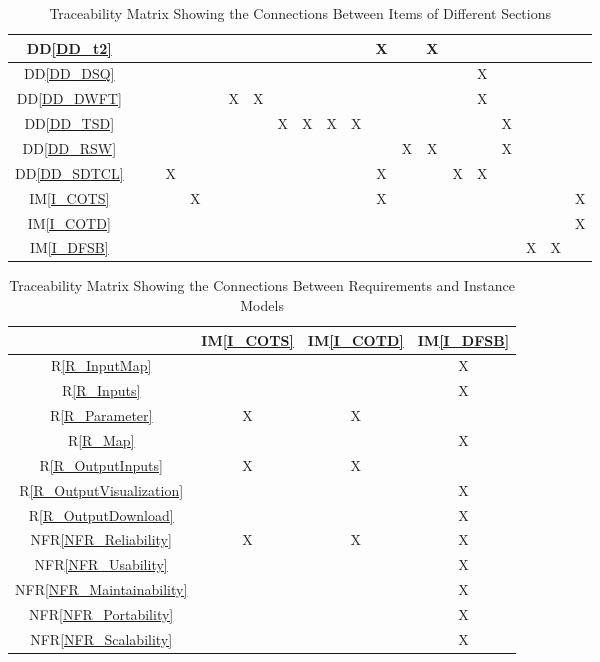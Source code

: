 \documentclass[12pt]{article}
\newcommand{\ddref}[1]{DD\ref{#1}}
\newcommand{\iref}[1]{IM\ref{#1}}
\newcommand{\rref}[1]{R\ref{#1}}
\newcommand{\nfrref}[1]{NFR\ref{#1}}
\begin{document}
\begin{landscape}
\begin{table}[h]
\begin{tabular}{|c|c|c|c|c|c|c|c|c|c|c|c|c|c|c|c|c|c|c|c|c|}
\ddref{DD_t2}        &  &  &  & & &  & &  &  &  &  & X & &  X &  & &&  & & \\ \hline
\ddref{DD_DSQ}     &  &  &  & & &  & &  &  &  &  & & &  &  & X &&  & &  \\ \hline
\ddref{DD_DWFT}     &  &  &  & & & X & X &  &  &  &  & & &  &  & X &&  & & \\ \hline
\ddref{DD_TSD}     &  &  &  & & &  & & X & X & X & X & & &  &  & &X&  & & \\ \hline
\ddref{DD_RSW}      &  &  &  & & &  & &  &  &  &  & & X & X &  & &X&  & & \\ \hline
\ddref{DD_SDTCL}    &  &  & X & & &  & &  &  &  &  & X & &  &  X&X &&  & & \\ \hline
\iref{I_COTS}        &  &  &  & X & &  & &  &  &  &  &  X & &  &  & &&  & & X \\ \hline
\iref{I_COTD}        &  &  &  & & &  & &  &  &  &  & & &  &  & &&  & & X \\ \hline
\iref{I_DFSB}       &  &  &  & & &  & &  &  &  &  & & &  &  & &&  X & X & \\ \hline
\hline
\end{tabular}
\caption{Traceability Matrix Showing the Connections Between Items of Different Sections}
\label{Table:A_trace}
\end{table}
 \end{landscape}

\newpage
\begin{table}[H]
\centering
\begin{tabular}{|c|c|c|c|}
\hline 
	& \iref{I_COTS} & \iref{I_COTD} & \iref{I_DFSB}  \\

\hline
\rref{R_InputMap} & & & X  \\ \hline
\rref{R_Inputs}     & & & X \\ \hline

\rref{R_Parameter} & X & X &  \\ \hline

\rref{R_Map} &&& X \\ \hline
\rref{R_OutputInputs} & X  &X & \\ \hline
\rref{R_OutputVisualization} & & & X\\ \hline

\rref{R_OutputDownload} &  & & X\\ \hline
\nfrref{NFR_Reliability}   & X & X & X \\ \hline
\nfrref{NFR_Usability}   & & & X \\ \hline
\nfrref{NFR_Maintainability}   & & & X \\ \hline
\nfrref{NFR_Portability}   & & & X \\ \hline
\nfrref{NFR_Scalability}   & & & X \\
\hline
\end{tabular}
\caption{Traceability Matrix Showing the Connections Between Requirements and Instance Models}
\label{Table:R_trace}
\end{table}
\end{document}
